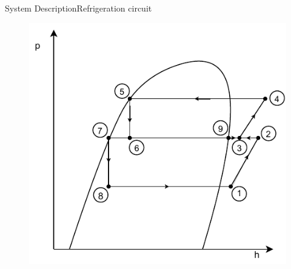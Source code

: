 \begin{frame}{System Description}{Refrigeration circuit}
\begin{figure}[h]
	\begin{minipage}{0.4\textwidth}
		\centering
		\includegraphics[width=1.05\textwidth]{../Graphics/Flash_Tank_P-h_Diagram} %
	\end{minipage}
\end{figure}
\end{frame}

%	

%

